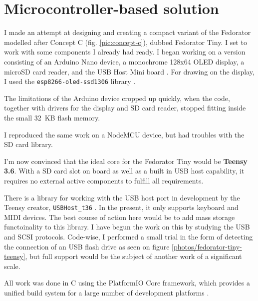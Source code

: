 \chapter{Microcontroller-based solution}
    
    I made an attempt at designing and creating a compact variant of the Fedorator modelled after Concept C  (fig. \ref{pic:concept-c}), dubbed Fedorator Tiny.  I set to work with some components I already had ready.  I began working on a version consisting of an Arduino Nano device, a monochrome 128x64 OLED display, a microSD card reader, and the USB Host Mini board \cite{usb-host-shield}.  For drawing on the display, I used the \texttt{esp8266-oled-ssd1306} library \cite{esp8266-oled-ssd1306}.
    
    The limitations of the Arduino device cropped up quickly, when the code, together with drivers for the display and SD card reader, stopped fitting inside the small 32~KB flash memory.
    
    I reproduced the same work on a NodeMCU device, but had troubles with the SD card library.
    
    I'm now convinced that the ideal core for the Fedorator Tiny would be \textbf{Teensy 3.6}.  With a SD card slot on board as well as a built in USB host capability, it requires no external active components to fulfill all requirements.
    
    There is a library for working with the USB host port in development by the Teensy creator, \texttt{USBHost\_t36} \cite{usbhost_t36}.  In the present, it only supports keyboard and MIDI devices.  The best course of action here would be to add mass storage functoinality to this library.  I have begun the work on this by studying the USB and SCSI protocols.  Code-wise, I performed a small trial in the form of detecting the connection of an USB flash drive as seen on figure \ref{photos/fedorator-tiny-teensy}, but full support would be the subject of another work of a significant scale.
    
    All work was done in C using the PlatformIO Core framework, which provides a unified build system for a large number of development platforms \cite{platformio-core}.
    
    
